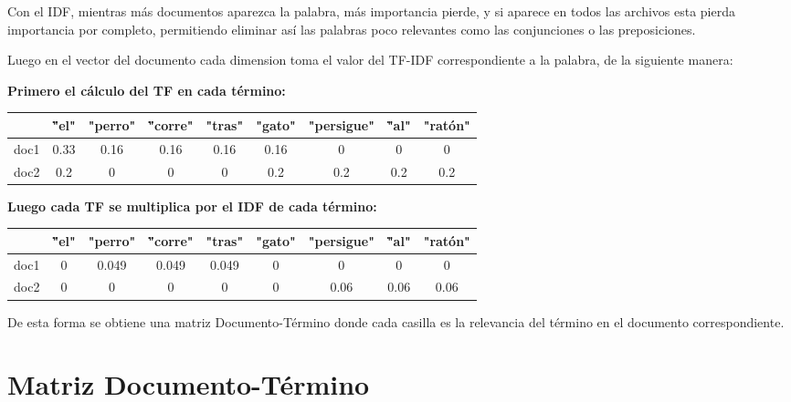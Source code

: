 \documentclass[10pt]{article}
\begin{document}
Con el IDF, mientras más documentos aparezca la palabra, más importancia pierde, y si aparece en todos las archivos esta pierda importancia por completo, permitiendo eliminar así las palabras poco relevantes como las conjunciones o las preposiciones.

\vspace{.2cm}

Luego en el vector del documento cada dimension toma el valor del TF-IDF
correspondiente a la palabra, de la siguiente manera:

\vspace{.2cm}
\textbf{Primero el cálculo del TF en cada término:}

\begin{table}[h]
	\centering
	\bfseries \textcolor[RGB]{50,50,50}{
		\begin{tabular}{|c|c|c|c|c|c|c|c|c|}
			\hline
			\rowcolor[RGB]{200,200,200}
			& \""el" & "perro" & \""corre" & "tras" & "gato" & "persigue" & \""al" & "ratón" \\
			\hline
			\rowcolor[RGB]{200,200,200}
			doc1 & 0.33 & 0.16 & 0.16 & 0.16 & 0.16 & 0 & 0 & 0 \\
			\hline
			\rowcolor[RGB]{200,200,200}
			doc2 & 0.2 & 0 & 0 & 0 & 0.2 & 0.2 & 0.2 & 0.2 \\
			\hline
		\end{tabular}
	}
\end{table}

\textbf{Luego cada TF se multiplica por el IDF de cada término:}
\begin{table}[h]
	\centering
	\bfseries \textcolor[RGB]{50,50,50}{
		\begin{tabular}{|c|c|c|c|c|c|c|c|c|}
			\hline
			\rowcolor[RGB]{200,200,200}
			& \""el" & "perro" & \""corre" & "tras" & "gato" & "persigue" & \""al" & "ratón" \\
			\hline
			\rowcolor[RGB]{200,200,200}
			doc1 & 0 & 0.049 & 0.049 & 0.049 & 0 & 0 & 0 & 0 \\
			\hline
			\rowcolor[RGB]{200,200,200}
			doc2 & 0 & 0 & 0 & 0 & 0 & 0.06 & 0.06 & 0.06 \\
			\hline
		\end{tabular}
	}
\end{table}

De esta forma se obtiene una matriz Documento-Término donde cada casilla es la relevancia del término en el documento correspondiente.

\section{Matriz Documento-Término}
\label{sec:matrix}
\end{document}

